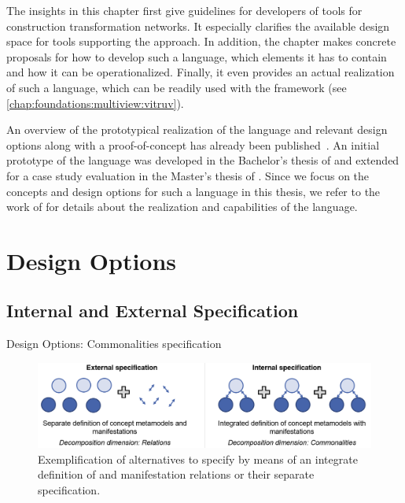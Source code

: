 
The insights in this chapter first give guidelines for developers of tools for construction transformation networks.
It especially clarifies the available design space for tools supporting the \commonalities approach.
In addition, the chapter makes concrete proposals for how to develop such a language, which elements it has to contain and how it can be operationalized.
Finally, it even provides an actual realization of such a language, which can be readily used with the \vitruv framework (see \autoref{chap:foundations:multiview:vitruv}).

An overview of the prototypical realization of the \commonalities language and relevant design options along with a proof-of-concept has already been published~.
An initial prototype of the language was developed in the Bachelor's thesis of  and extended for a case study evaluation in the Master's thesis of .
Since we focus on the concepts and design options for such a language in this thesis, we refer to the work of  for details about the realization and capabilities of the \commonalities language.



\section{Design Options}

\subsection{Internal and External Specification}

Design Options: Commonalities specification

\begin{figure}
    \centering
    \includegraphics[width=\textwidth]{figures/quality/language/design_options.png}
    \caption[Design options for \commonalities specification]{Exemplification of alternatives to specify \commonalities by means of an integrate definition of \conceptmetamodels and manifestation relations or their separate specification.}
    \label{fig:language:design_options}
\end{figure}

